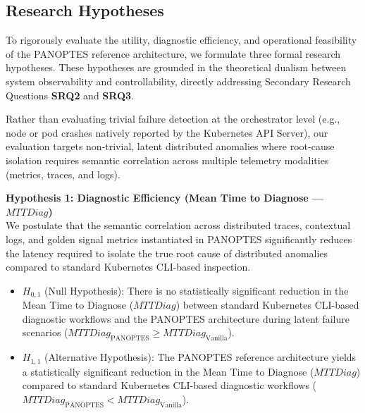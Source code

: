 \subsection{Research Hypotheses}

To rigorously evaluate the utility, diagnostic efficiency, and operational feasibility of the PANOPTES reference architecture, we formulate three formal research hypotheses. These hypotheses are grounded in the theoretical dualism between system observability and controllability, directly addressing Secondary Research Questions \textbf{SRQ2} and \textbf{SRQ3}.

Rather than evaluating trivial failure detection at the orchestrator level (e.g., node or pod crashes natively reported by the Kubernetes API Server), our evaluation targets non-trivial, latent distributed anomalies where root-cause isolation requires semantic correlation across multiple telemetry modalities (metrics, traces, and logs).

\textbf{Hypothesis 1: Diagnostic Efficiency (Mean Time to Diagnose --- $MTTDiag$)}\\
We postulate that the semantic correlation across distributed traces, contextual logs, and golden signal metrics instantiated in PANOPTES significantly reduces the latency required to isolate the true root cause of distributed anomalies compared to standard Kubernetes CLI-based inspection.
\begin{itemize}
    \item $H_{0,1}$ (Null Hypothesis): There is no statistically significant reduction in the Mean Time to Diagnose ($MTTDiag$) between standard Kubernetes CLI-based diagnostic workflows and the PANOPTES architecture during latent failure scenarios ($MTTDiag_{\text{PANOPTES}} \ge MTTDiag_{\text{Vanilla}}$).
    \item $H_{1,1}$ (Alternative Hypothesis): The PANOPTES reference architecture yields a statistically significant reduction in the Mean Time to Diagnose ($MTTDiag$) compared to standard Kubernetes CLI-based diagnostic workflows ($MTTDiag_{\text{PANOPTES}} < MTTDiag_{\text{Vanilla}}$).
\end{itemize}

